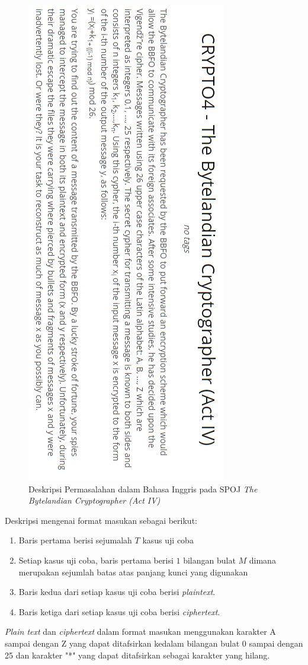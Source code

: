 	\begin{figure}[H]
		\centering
		\includegraphics[scale=0.75]{images/bab2/crypto_def.png}
		\caption{Deskripsi Permasalahan dalam Bahasa Inggris pada SPOJ \textit{The Bytelandian Cryptographer (Act IV)}}
		\label{fig:crypto4_def}
	\end{figure}
	
	Deskripsi mengenai format masukan sebagai berikut:
	\begin{enumerate}
	\item Baris pertama berisi sejumalah $T$ kasus uji coba
	\item Setiap kasus uji coba, baris pertama berisi $1$ bilangan bulat $M$ dimana merupakan sejumlah batas atas panjang kunci yang digunakan 
	\item Baris kedua dari setiap kasus uji coba berisi \textit{plaintext}.
	\item Baris ketiga dari setiap kasus uji coba berisi \textit{ciphertext}.
	\end{enumerate}
	\textit{Plain text} dan \textit{ciphertext} dalam format masukan menggunakan karakter A sampai dengan Z yang dapat ditafsirkan kedalam bilangan bulat 0 sampai dengan 25 dan karakter "*" yang dapat ditafsirkan sebagai karakter yang hilang.
	
